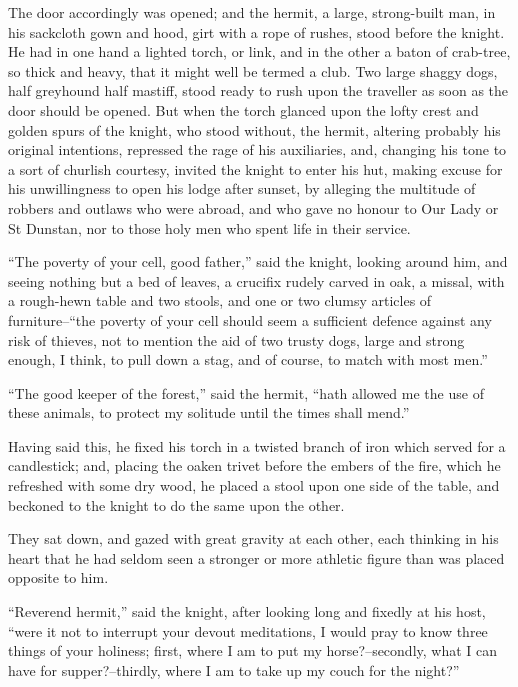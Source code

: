 The door accordingly was opened; and the hermit, a large, strong-built
man, in his sackcloth gown and hood, girt with a rope of rushes, stood
before the knight. He had in one hand a lighted torch, or link, and in
the other a baton of crab-tree, so thick and heavy, that it might well
be termed a club. Two large shaggy dogs, half greyhound half mastiff,
stood ready to rush upon the traveller as soon as the door should be
opened. But when the torch glanced upon the lofty crest and golden spurs
of the knight, who stood without, the hermit, altering probably his
original intentions, repressed the rage of his auxiliaries, and,
changing his tone to a sort of churlish courtesy, invited the knight to
enter his hut, making excuse for his unwillingness to open his lodge
after sunset, by alleging the multitude of robbers and outlaws who were
abroad, and who gave no honour to Our Lady or St Dunstan, nor to those
holy men who spent life in their service.

``The poverty of your cell, good father,'' said the knight, looking
around him, and seeing nothing but a bed of leaves, a crucifix rudely
carved in oak, a missal, with a rough-hewn table and two stools, and one
or two clumsy articles of furniture--``the poverty of your cell should
seem a sufficient defence against any risk of thieves, not to mention
the aid of two trusty dogs, large and strong enough, I think, to pull
down a stag, and of course, to match with most men.''

``The good keeper of the forest,'' said the hermit, ``hath allowed me
the use of these animals, to protect my solitude until the times shall
mend.''

Having said this, he fixed his torch in a twisted branch of iron which
served for a candlestick; and, placing the oaken trivet before the
embers of the fire, which he refreshed with some dry wood, he placed a
stool upon one side of the table, and beckoned to the knight to do the
same upon the other.

They sat down, and gazed with great gravity at each other, each thinking
in his heart that he had seldom seen a stronger or more athletic figure
than was placed opposite to him.

``Reverend hermit,'' said the knight, after looking long and fixedly at
his host, ``were it not to interrupt your devout meditations, I would
pray to know three things of your holiness; first, where I am to put my
horse?--secondly, what I can have for supper?--thirdly, where I am to
take up my couch for the night?''


